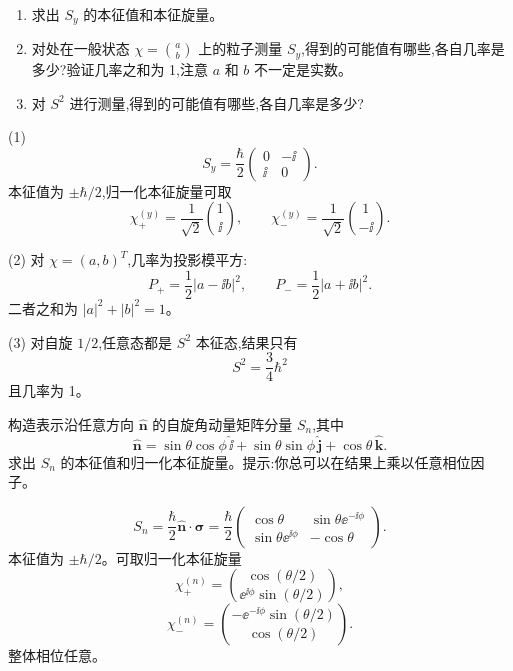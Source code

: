 \begin{question}
\begin{enumerate}
\item 求出 $S_y$ 的本征值和本征旋量。
\item 对处在一般状态 $\chi=\binom{a}{b}$ 上的粒子测量 $S_y$,得到的可能值有哪些,各自几率是多少?验证几率之和为 1,注意 $a$ 和 $b$ 不一定是实数。
\item 对 $S^2$ 进行测量,得到的可能值有哪些,各自几率是多少?
\end{enumerate}
\end{question}
\begin{solution}

(1) 
\[
S_y=\frac\hbar2\begin{pmatrix}0&-\ii\\ \ii&0\end{pmatrix}.
\]
本征值为 $\pm\hbar/2$,归一化本征旋量可取
\[
\chi_+^{(y)}=\frac1{\sqrt2}\binom{1}{\ii},
\qquad
\chi_-^{(y)}=\frac1{\sqrt2}\binom{1}{-\ii}.
\]

(2) 对 $\chi=(a,b)^T$,几率为投影模平方:
\[
P_+=\frac12|a-\ii b|^2,
\qquad
P_-=\frac12|a+\ii b|^2.
\]
二者之和为 $|a|^2+|b|^2=1$。

(3) 对自旋 $1/2$,任意态都是 $S^2$ 本征态,结果只有
\[
S^2=\frac34\hbar^2
\]
且几率为 1。

\end{solution}

\begin{question}
构造表示沿任意方向 $\hat{\mathbf n}$ 的自旋角动量矩阵分量 $S_n$,其中
\[
\hat{\mathbf n}=\sin\theta\cos\phi\,\hat{\mathbf \ii}+\sin\theta\sin\phi\,\hat{\mathbf j}+\cos\theta\,\hat{\mathbf k}.
\]
求出 $S_n$ 的本征值和归一化本征旋量。提示:你总可以在结果上乘以任意相位因子。
\end{question}
\begin{solution}

\[
S_n=\frac\hbar2\hat{\mathbf n}\cdot\boldsymbol\sigma
=\frac\hbar2\begin{pmatrix}
\cos\theta&\sin\theta \ee^{-\ii\phi}\\
\sin\theta \ee^{\ii\phi}&-\cos\theta
\end{pmatrix}.
\]
本征值为 $\pm\hbar/2$。可取归一化本征旋量
\[
\chi_+^{(n)}=\binom{\cos(\theta/2)}{\ee^{\ii\phi}\sin(\theta/2)},
\]
\[
\chi_-^{(n)}=\binom{-\ee^{-\ii\phi}\sin(\theta/2)}{\cos(\theta/2)}.
\]
整体相位任意。

\end{solution}

